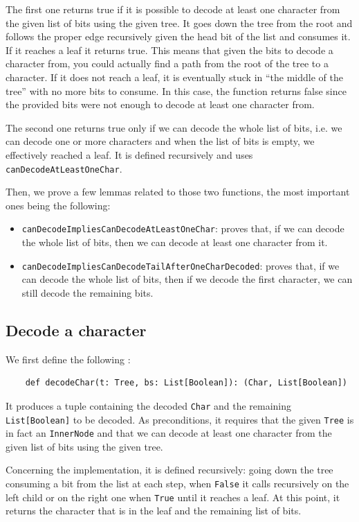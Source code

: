 \documentclass[a4paper,UKenglish,cleveref, autoref, thm-restate]{lipics-v2021}
\begin{document}
The first one returns true if it is possible to decode at least one character from the given list of bits using the given tree. 
It goes down the tree from the root and follows the proper edge recursively given the head bit of the list and consumes it. If it reaches a leaf it returns true. 
This means that given the bits to decode a character from, you could actually find a path from the root of the tree to a character. If it does not reach a leaf, 
it is eventually stuck in ``the middle of the tree'' with no more bits to consume. In this case, the function returns false since the provided bits were not enough to decode at least one character from.

The second one returns true only if we can decode the whole list of bits, i.e. we can decode one or more characters and when the list of bits is empty, we effectively reached a leaf. It is defined recursively and uses \lstinline{canDecodeAtLeastOneChar}.

Then, we prove a few lemmas related to those two functions, the most important ones being the following:
\begin{itemize}
    \item \lstinline{canDecodeImpliesCanDecodeAtLeastOneChar}: proves that, if we can decode the whole list of bits, then we can decode at least one character from it.
    \item \lstinline{canDecodeImpliesCanDecodeTailAfterOneCharDecoded}: proves that, if we can decode the whole list of bits, then if we decode the first character, we can still decode the remaining bits.
\end{itemize}

\subsection{Decode a character}
We first define the following :

\begin{lstlisting}
    def decodeChar(t: Tree, bs: List[Boolean]): (Char, List[Boolean])
\end{lstlisting}

It produces a tuple containing the decoded \lstinline{Char} and the remaining \lstinline{List[Boolean]} to be decoded.
As preconditions, it requires that the given \lstinline{Tree} is in fact an \lstinline{InnerNode} and that we can decode at least one character from the given list of bits using the given tree.

Concerning the implementation, it is defined recursively: going down the tree consuming a bit from the list at each step, when \lstinline{False} it calls recursively on the left child or on the right one when \lstinline{True} until it reaches a leaf. At this point,
it returns the character that is in the leaf and the remaining list of bits.
\end{document}
